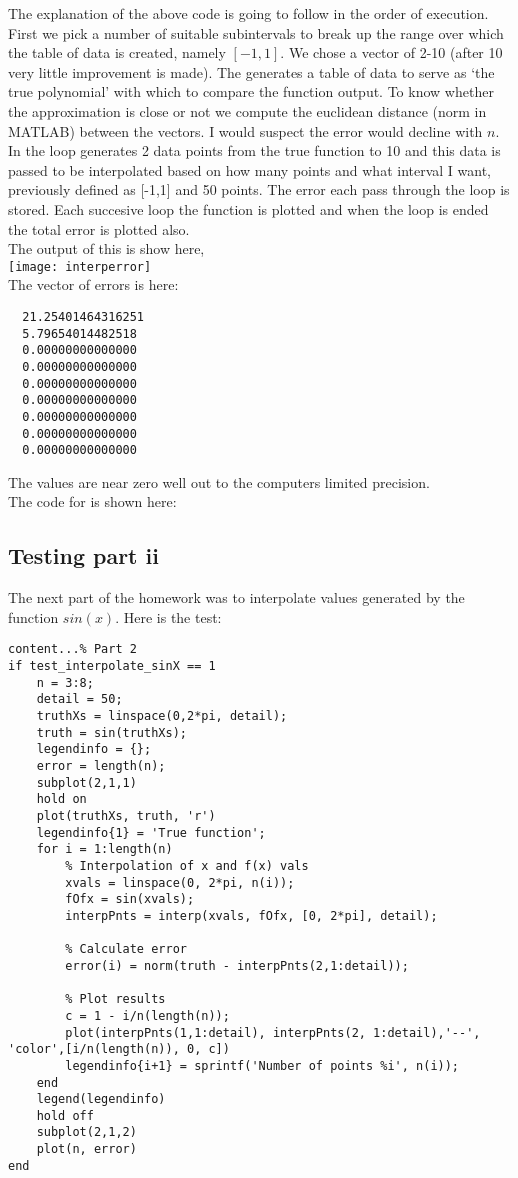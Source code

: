 \documentclass[]{article}
\begin{document}
The explanation of the above code is going to follow in the order of execution. First we pick a number of suitable subintervals to break up the range over which the table of data is created, namely $ [-1,1] $. We chose a vector of 2-10 (after 10 very little improvement is made). The  generates a table of data to serve as `the true polynomial' with which to compare the function output. To know whether the approximation is close or not we compute the euclidean distance (norm in MATLAB) between the vectors. I would suspect the error would decline with $ n $. In the loop  generates 2 data points from the true function to 10 and this data is passed to be interpolated based on how many points and what interval I want, previously defined as [-1,1] and 50 points. The error each pass through the loop is stored. Each succesive loop the function is plotted and when the loop is ended the total error is plotted also. \\

The output of this is show here, \\
\texttt{[image: interperror]} \\
The vector of errors is here:
\begin{verbatim}
  21.25401464316251
  5.79654014482518
  0.00000000000000
  0.00000000000000
  0.00000000000000
  0.00000000000000
  0.00000000000000
  0.00000000000000
  0.00000000000000
\end{verbatim}
The values are near zero well out to the computers limited precision. \\

The code for  is shown here:


\subsection*{Testing part ii} The next part of the homework was to interpolate values generated by the function $ sin(x) $. Here is the test:
\begin{lstlisting}
content...% Part 2
if test_interpolate_sinX == 1 
	n = 3:8;
	detail = 50;
	truthXs = linspace(0,2*pi, detail);
	truth = sin(truthXs);
	legendinfo = {};
	error = length(n);
	subplot(2,1,1)
	hold on
	plot(truthXs, truth, 'r')
	legendinfo{1} = 'True function';
	for i = 1:length(n)
		% Interpolation of x and f(x) vals
		xvals = linspace(0, 2*pi, n(i));
		fOfx = sin(xvals);
		interpPnts = interp(xvals, fOfx, [0, 2*pi], detail);
		
		% Calculate error
		error(i) = norm(truth - interpPnts(2,1:detail));
		
		% Plot results
		c = 1 - i/n(length(n));
		plot(interpPnts(1,1:detail), interpPnts(2, 1:detail),'--', 'color',[i/n(length(n)), 0, c])
		legendinfo{i+1} = sprintf('Number of points %i', n(i));
	end
	legend(legendinfo)
	hold off
	subplot(2,1,2)
	plot(n, error)
end
\end{lstlisting}
\end{document}
